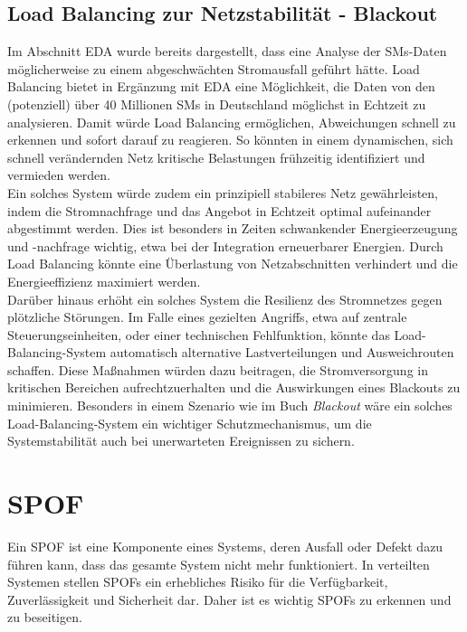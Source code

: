 \documentclass[a4paper,12pt]{article}
\let\stdsection\section
\renewcommand\section{\newpage\stdsection}
\begin{document}
\subsection{Load Balancing zur Netzstabilität - Blackout}
Im Abschnitt \ac{EDA} wurde bereits dargestellt, dass eine Analyse der \acp{SM}-Daten möglicherweise zu einem abgeschwächten Stromausfall geführt hätte. Load Balancing bietet in Ergänzung mit \ac{EDA} eine Möglichkeit, die Daten von den (potenziell) über 40 Millionen \cite{Haushalte} \acp{SM} in Deutschland möglichst in Echtzeit zu analysieren. Damit würde Load Balancing ermöglichen, Abweichungen schnell zu erkennen und sofort darauf zu reagieren. So könnten in einem dynamischen, sich schnell verändernden Netz kritische Belastungen frühzeitig identifiziert und vermieden werden.\\
Ein solches System würde zudem ein prinzipiell stabileres Netz gewährleisten, indem die Stromnachfrage und das Angebot in Echtzeit optimal aufeinander abgestimmt werden. Dies ist besonders in Zeiten schwankender Energieerzeugung und -nachfrage wichtig, etwa bei der Integration erneuerbarer Energien. Durch Load Balancing könnte eine Überlastung von Netzabschnitten verhindert und die Energieeffizienz maximiert werden.\\
Darüber hinaus erhöht ein solches System die Resilienz des Stromnetzes gegen plötzliche Störungen. Im Falle eines gezielten Angriffs, etwa auf zentrale Steuerungseinheiten, oder einer technischen Fehlfunktion, könnte das Load-Balancing-System automatisch alternative Lastverteilungen und Ausweichrouten schaffen. Diese Maßnahmen würden dazu beitragen, die Stromversorgung in kritischen Bereichen aufrechtzuerhalten und die Auswirkungen eines Blackouts zu minimieren. Besonders in einem Szenario wie im Buch \textit{Blackout} wäre ein solches Load-Balancing-System ein wichtiger Schutzmechanismus, um die Systemstabilität auch bei unerwarteten Ereignissen zu sichern.

\section{\ac{SPOF}}

Ein \ac{SPOF} ist eine Komponente eines Systems, deren Ausfall oder Defekt dazu führen kann, dass das gesamte System nicht mehr funktioniert. In verteilten Systemen stellen \acp{SPOF} ein erhebliches Risiko für die Verfügbarkeit, Zuverlässigkeit und Sicherheit dar. Daher ist es wichtig \acp{SPOF} zu erkennen und zu beseitigen. 
\end{document}

